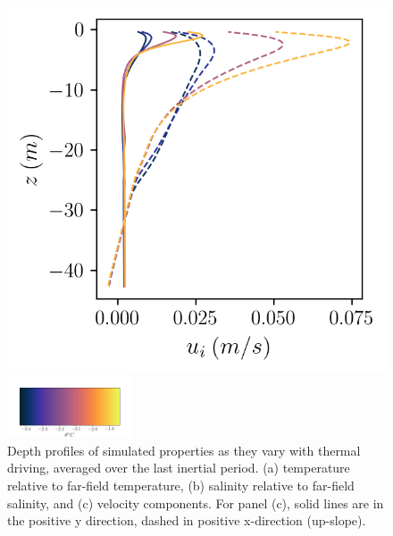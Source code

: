 \documentclass[draft]{agujournal2019}
\begin{document}
\begin{figure}[h!]
\begin{minipage}{0.33\textwidth}
    \end{minipage}%
    \begin{minipage}{0.33\textwidth}
        \includegraphics[trim={0 7.5cm 0 0},clip, width=\textwidth]{Figures/velocity_cmp_dT_43h_tav13h_z_profile.png}
    \end{minipage}
    \newline\includegraphics[width=0.33\textwidth,trim={1cm 0cm 1cm 5cm}, clip]{Figures/colorbar_thermal_driving.png}
    \caption{Depth profiles of simulated properties as they vary with thermal driving, averaged over the last inertial period. (a) temperature relative to far-field temperature, (b) salinity relative to far-field salinity, and (c) velocity components. For panel (c), solid lines are in the positive y direction, dashed in positive x-direction (up-slope).}
    \label{fig:dT_profiles}
\end{figure}
\end{document}

